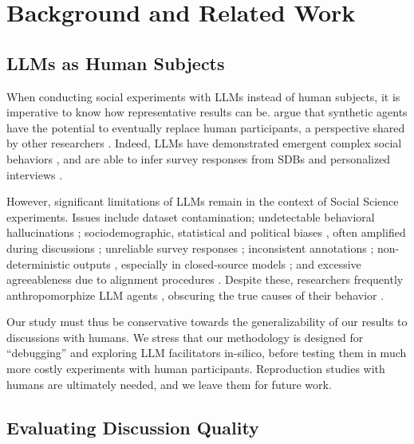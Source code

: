 %
\section{Background and Related Work}

\subsection{LLMs as Human Subjects}
\label{ssec:related:human-llm}

When conducting social experiments with \acp{LLM} instead of human subjects, it is imperative to know how representative results can be. \citet{grossman_2023} argue that synthetic agents have the potential to eventually replace human participants, a perspective shared by other researchers \cite{tornberg_2023, argyle2023}. Indeed, \acp{LLM} have demonstrated emergent complex social behaviors \cite{Park2023GenerativeAI, demarzo_2023, leng_2024, abdelnabi_negotiations, abramski_2023}, and are able to infer survey responses from \acp{SDB} \cite{hewitt2024predicting} and personalized interviews \cite{park2024generativeagentsimulations1000}.

However, significant limitations of \acp{LLM} remain in the context of Social Science experiments. Issues include dataset contamination; undetectable behavioral hallucinations \cite{rossi_2024}; sociodemographic, statistical and political biases \cite{anthis_2025,hewitt2024predicting,rossi_2024}, often amplified during discussions \cite{Taubenfeld2024SystematicBI}; unreliable survey responses \cite{jansen_2023,bisbee_2023,neumann_2025}; inconsistent annotations \cite{Gligoric2024CanUL}; non-deterministic outputs \cite{atil_2025}, especially in closed-source models \cite{bisbee_2023}; and excessive agreeableness due to alignment procedures \cite{Park2023GenerativeAI, anthis_2025, rossi_2024}. Despite these, researchers frequently anthropomorphize \ac{LLM} agents \cite{rossi_2024}, obscuring the true causes of their behavior \cite{anthis_2025,zhou-etal-2024-real}. 

Our study must thus be conservative towards the generalizability of our results to discussions with humans. We stress that our methodology is designed for “debugging” and exploring \ac{LLM} facilitators in-silico, before testing them in much more costly experiments with human participants. Reproduction studies with humans are ultimately needed, and we leave them for future work.


\subsection{Evaluating Discussion Quality}
\label{ssec:related:quality}

